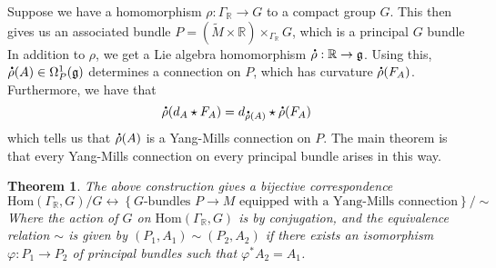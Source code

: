 \documentclass[psamsfonts, 12pt]{amsart}
\newtheorem{thm}{Theorem}[section]
\theoremstyle{definition}
\theoremstyle{remark}
\renewcommand{\hom}{\mathrm{Hom}}
\newcommand{\R}{\mathbb{R}}
\newcommand{\g}{\mathfrak{g}}
\newcommand*{\dt}[1]{%
   \accentset{\mbox{\large\bfseries .}}{#1}}
\newcommand{\set}[1]{\left\lbrace #1 \right\rbrace}
\begin{document}
Suppose we have a homomorphism $\rho : \Gamma_\R \to G$ to a compact group $G$.
This then gives us an associated bundle
$P = (\widetilde{M}\times \R) \times_{\Gamma_\R} G$, which is a principal $G$ bundle
In addition to $\rho$, we get a Lie algebra homomorphism
$\dt{\rho} : \R \to \g$. Using this, $\dt{\rho}(A) \in \Omega^1_P(\g)$ determines
a connection on $P$, which has curvature $\dt{\rho}(F_A)$. Furthermore, we have that
\[
\dt{\rho}(d_A\star F_A) = d_{\dt{\rho}(A)}\star\dt{\rho}(F_A)
\]
which tells us that $\dt{\rho}(A)$ is a Yang-Mills connection on $P$. The main theorem
is that every Yang-Mills connection on every principal bundle arises in this way.
%
\begin{thm}
The above construction gives a bijective correspondence
\[
\hom(\Gamma_\R, G) / G \longleftrightarrow
\set{G\text{-bundles } P \to M
\text{ equipped with a Yang-Mills connection}}/\sim
\]
Where the action of $G$ on $\hom(\Gamma_\R,G)$ is by conjugation, and the
equivalence relation $\sim$ is given by $(P_1,A_1) \sim (P_2,A_2)$ if
there exists an isomorphism $\varphi : P_1 \to P_2$ of principal bundles such that
$\varphi^*A_2 = A_1$.
\end{thm}
%
\end{document}
